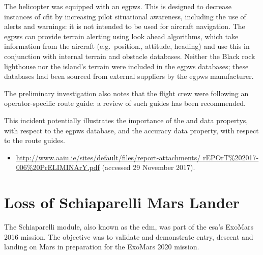 The helicopter was equipped with an \gls{egpws}. This is designed to decrease instances of \gls{cfit} by increasing pilot situational awareness, including the use of alerts and warnings: it is not intended to be used for aircraft navigation. The \gls{egpws} can provide terrain alerting using look ahead algorithms, which take \gls{information} from the aircraft (e.g.\ position., attitude, heading) and use this in conjunction with internal terrain and obstacle \glspl{database}. Neither the Black rock lighthouse nor the island's terrain were included in the \gls{egpws} \glspl{database}; these \glspl{database} had been sourced from external suppliers by the \gls{egpws} manufacturer.

The preliminary investigation also notes that the flight crew were following an operator-specific route guide: a review of such guides has been recommended.

This incident potentially illustrates the importance of the  and  \glspl{data property}, with respect to the \gls{egpws} \gls{database}, and the \gls{accuracy} \gls{data property}, with respect to the route guides.

\begin{samepage}
\begin{itemize}
  \item \raggedright{\href{http://www.aaiu.ie/sites/default/files/report-attachments/rEPOrT\%202017-006\%20PrELIMINArY.pdf}{http://www.aaiu.ie/sites/default/files/report-attachments/ rEPOrT\%202017-006\%20PrELIMINArY.pdf} (accessed 29 November 2017).}
\end{itemize}
\end{samepage}


\section{Loss of Schiaparelli Mars Lander} \label{bkm:incacc:schiaparelli}
The Schiaparelli module, also known as the \gls{edm}, was part of the \gls{esa}'s ExoMars 2016 mission. The objective was to validate and demonstrate entry, descent and landing on Mars in preparation for the ExoMars 2020 mission.

